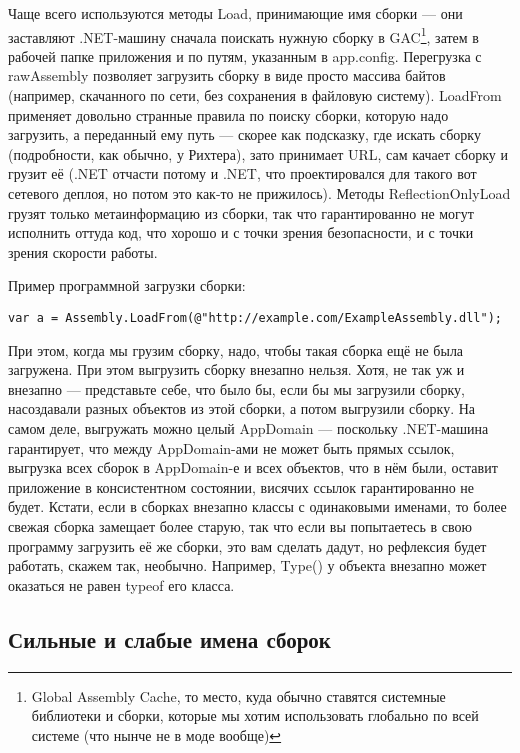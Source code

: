 \documentclass{../../text-style}
\begin{document}
Чаще всего используются методы Load, принимающие имя сборки --- они заставляют .NET-машину сначала поискать нужную сборку в GAC\footnote{Global Assembly Cache, то место, куда обычно ставятся системные библиотеки и сборки, которые мы хотим использовать глобально по всей системе (что нынче не в моде вообще)}, затем в рабочей папке приложения и по путям, указанным в app.config. Перегрузка с rawAssembly позволяет загрузить сборку в виде просто массива байтов (например, скачанного по сети, без сохранения в файловую систему). LoadFrom применяет довольно странные правила по поиску сборки, которую надо загрузить, а переданный ему путь --- скорее как подсказку, где искать сборку (подробности, как обычно, у Рихтера), зато принимает URL, сам качает сборку и грузит её (.NET отчасти потому и .NET, что проектировался для такого вот сетевого деплоя, но потом это как-то не прижилось). Методы ReflectionOnlyLoad грузят только метаинформацию из сборки, так что гарантированно не могут исполнить оттуда код, что хорошо и с точки зрения безопасности, и с точки зрения скорости работы.

Пример программной загрузки сборки:

\begin{verbatim}
var a = Assembly.LoadFrom(@"http://example.com/ExampleAssembly.dll");
\end{verbatim}

При этом, когда мы грузим сборку, надо, чтобы такая сборка ещё не была загружена. При этом выгрузить сборку внезапно нельзя. Хотя, не так уж и внезапно --- представьте себе, что было бы, если бы мы загрузили сборку, насоздавали разных объектов из этой сборки, а потом выгрузили сборку. На самом деле, выгружать можно целый AppDomain --- поскольку .NET-машина гарантирует, что между AppDomain-ами не может быть прямых ссылок, выгрузка всех сборок в AppDomain-е и всех объектов, что в нём были, оставит приложение в консистентном состоянии, висячих ссылок гарантированно не будет. Кстати, если в сборках внезапно классы с одинаковыми именами, то более свежая сборка замещает более старую, так что если вы попытаетесь в свою программу загрузить её же сборки, это вам сделать дадут, но рефлексия будет работать, скажем так, необычно. Например, Type() у объекта внезапно может оказаться не равен typeof его класса.

\subsection{Сильные и слабые имена сборок}
\end{document}
